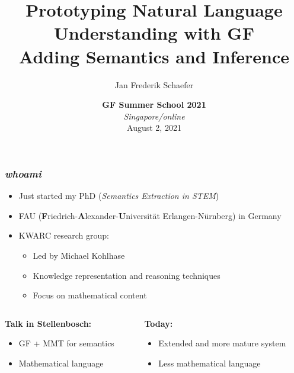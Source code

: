 \documentclass[aspectratio=169]{beamer}
\title{Prototyping Natural Language Understanding with GF \\ \large  Adding Semantics and Inference}
\author{Jan Frederik Schaefer}
\institute{FAU Erlangen-N\"urnberg}
\date{\textbf{GF Summer School 2021} \\ \textit{Singapore/online} \\ August 2, 2021 }
\begin{document}
\frame\titlepage

\begin{frame}
    \frametitle{\itshape whoami}
    \begin{itemize}
        \item Just started my PhD (\textit{Semantics Extraction in STEM})
        \item FAU ({\bf F}riedrich-{\bf A}lexander-{\bf U}niversit\"at Erlangen-N\"urnberg) in Germany
        \item KWARC research group:
            \begin{itemize}
                \item Led by Michael Kohlhase
                \item Knowledge representation and reasoning techniques
                \item Focus on mathematical content
            \end{itemize}
    \end{itemize}
    
    \vspace{1.5em}
    \begin{columns}[T]
        \begin{column}{0.45\textwidth}
            \textbf{Talk in Stellenbosch:}\\
            \begin{itemize}
                \item GF + MMT for semantics
                \item Mathematical language
            \end{itemize}
        \end{column}
        \begin{column}{0.45\textwidth}
            \textbf{Today:}\\
            \begin{itemize}
                \item Extended and more mature system
                \item Less mathematical language
            \end{itemize}
        \end{column}
    \end{columns}

\end{frame}




\end{document}
